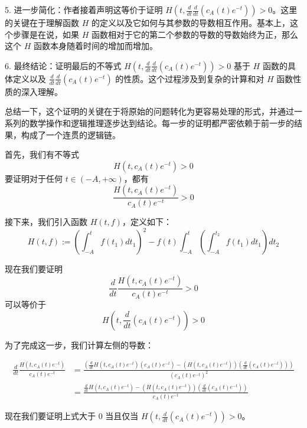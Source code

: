 \begin{remark}
5. 进一步简化：作者接着声明这等价于证明 $H(t,\frac{d}{dt}\frac{d}{dt}(c_{A}(t)e^{-t}))>0$。这里的关键在于理解函数 $H$ 的定义以及它如何与其参数的导数相互作用。基本上，这个步骤是在说，如果 $H$ 函数相对于它的第二个参数的导数的导数始终为正，那么这个 $H$ 函数本身随着时间的增加而增加。

6. 最终结论：证明最后的不等式 $H(t,\frac{d}{dt}\frac{d}{dt}(c_{A}(t)e^{-t}))>0$ 基于 $H$ 函数的具体定义以及 $\frac{d}{dt}\frac{d}{dt}(c_{A}(t)e^{-t})$ 的性质。这个过程涉及到复杂的计算和对 $H$ 函数性质的深入理解。

总结一下，这个证明的关键在于将原始的问题转化为更容易处理的形式，并通过一系列的数学操作和逻辑推理逐步达到结论。每一步的证明都严密依赖于前一步的结果，构成了一个连贯的逻辑链。
\end{remark}



首先，我们有不等式 \[ H(t,c_{A}(t)e^{-t}) > 0 \] 要证明对于任何 $t\in(-A,+\infty)$，都有 \[ \frac{H(t,c_{A}(t)e^{-t})}{c_{A}(t)e^{-t}} > 0 \] 

接下来，我们引入函数 $H(t,f)$，定义如下：
\[ H(t,f):=(\int_{-A}^{t}f(t_{1})dt_{1})^{2}-f(t)\int_{-A}^{t}(\int_{-A}^{t_{2}}f(t_{1})dt_{1})dt_{2} \]

现在我们要证明 \[ \frac{d}{dt}\frac{H(t,c_{A}(t)e^{-t})}{c_{A}(t)e^{-t}}>0 \] 可以等价于 \[ H(t,\frac{d}{dt}(c_{A}(t)e^{-t}))>0 \]

为了完成这一步，我们计算左侧的导数：

\begin{align*}
\frac{d}{dt}\frac{H(t,c_{A}(t)e^{-t})}{c_{A}(t)e^{-t}} &= \frac{(\frac{d}{dt}H(t,c_{A}(t)e^{-t})(c_{A}(t)e^{-t})-(H(t,c_{A}(t)e^{-t}))(\frac{d}{dt}(c_{A}(t)e^{-t})))}{(c_{A}(t)e^{-t})^2} \\
&= \frac{\frac{d}{dt}H(t,c_{A}(t)e^{-t})-(H(t,c_{A}(t)e^{-t}))(\frac{d}{dt}(c_{A}(t)e^{-t}))}{c_{A}(t)e^{-t}}
\end{align*}


现在我们要证明上式大于 $0$ 当且仅当 $H(t,\frac{d}{dt}(c_{A}(t)e^{-t}))>0$。


